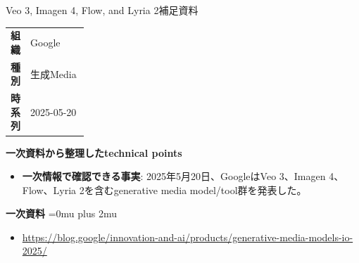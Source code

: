\begin{technicalnote}{Veo 3, Imagen 4, Flow, and Lyria 2}{補足資料}
\begingroup
\begin{tabularx}{\linewidth}{@{}>{\bfseries}p{0.22\linewidth}X@{}}
組織 & Google \\
種別 & 生成Media \\
時系列 & 2025-05-20 \\
\end{tabularx}
\smallskip
\begin{minipage}{\linewidth}
{\bfseries 一次資料から整理したtechnical points}
\begin{itemize}[leftmargin=1.5em,itemsep=0.35em]
\item \textbf{一次情報で確認できる事実}: 2025年5月20日、GoogleはVeo 3、Imagen 4、Flow、Lyria 2を含むgenerative media model/tool群を発表した。
\end{itemize}
\begin{samepage}
{\bfseries 一次資料}
\begingroup\sloppy
\Urlmuskip=0mu plus 2mu\relax
\begin{itemize}[leftmargin=1.5em,itemsep=0.25em]
\item {\scriptsize\url{https://blog.google/innovation-and-ai/products/generative-media-models-io-2025/}}
\end{itemize}
\endgroup
\end{samepage}
\end{minipage}
\endgroup
\end{technicalnote}
\medskip

